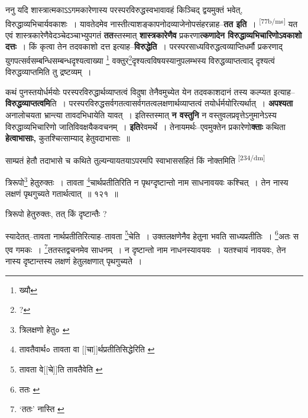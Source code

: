 \documentclass[article,12pt,a4paper]{memoir}
\begin{document}
	  \pstart ननु यदि शास्त्रात्मकाऽऽगमकारेणास्य परस्परविरुद्धस्वभावावहं किञ्चिद् द्वयमुक्तं भवेत्, विरुद्धाव्यभिचार्यवकाशः । यावतेदमेव नास्तीत्याशङ्कापनोदव्याजेनोपसंहरन्नाह--\textbf{तत इति} । \leavevmode\textsuperscript{\rmlatinfont\tiny [77b/ms]} यत एवं शास्त्रकारेणैवेदञ्चेदञ्चाभ्युपगतं \textbf{तत}स्तस्मात् \textbf{शास्त्रकारेणैव} प्रकरणा\textbf{त्कणादेन विरुद्धाव्यभिचारिणोऽवकाशो दत्तः} । किं कृत्वा तेन तदवकाशो दत्त इत्याह--\textbf{विरुद्धेति} । परस्परसाध्यविरुद्धत्वव्याप्तिधर्मौ प्रकरणाद् युगपत्सर्वसम्बन्धिसम्बन्धदृश्यत्वाख्या \footnote{ख्यौ} वक्तुर\footnote{?}दृश्यत्वविषयस्यानुपलम्भस्य विरुद्धव्याप्तत्वाद् दृश्यत्वं विरुद्धव्याप्तमिति तु द्रष्टव्यम् ।
	\pend
      

	  \pstart कथं पुनस्तयोर्धर्मयोः परस्परविरुद्धार्थव्याप्तत्वं विदुषा तेनैवमुच्येत येन तदवकाशदानं तस्य कल्प्यत इत्याह--\textbf{विरुद्धव्याप्तत्वमि}ति । परस्परविरुद्धसर्वगतत्वासर्वगतत्वलक्षणार्थव्याप्तत्वं तयोर्धर्मयोरित्यर्थात् । \textbf{अपश्यता} अनालोचयता भ्रान्त्या तावदभिधायेति यावत् । इतिस्तस्मात् \textbf{न वस्तुनि} न वस्तुवलप्रवृत्तेऽनुमानेऽस्य विरुद्धाव्यभिचारिणो जातिविवक्षयैकवचनम् । \textbf{इति}रेवमर्थे । तेनायमर्थः--एवमुक्तेन प्रकारेणो\textbf{क्ताः} कथिता \textbf{हेत्वाभासाः,} कुतश्चित्साम्याद् हेतुवदाभासाः ॥
	\pend
      

	  \pstart साम्प्रतं हेतौ तदाभासे च कथिते तुल्यन्यायतयाऽपरमपि स्वाभाससहितं किं नोक्तमिति  \leavevmode\textsuperscript{\rmlatinfont\tiny [234/dm]} 
	  
	त्रिरूपो\footnote{त्रिलक्षणो हेतु० \cite{dp-msC}} हेतुरुक्तः । तावता \footnote{तावतैवार्थ० \cite{dp-msB} \cite{dp-msD} \cite{dp-edP} \cite{dp-edH} \cite{dp-edE} \cite{dp-edN} तावता वा [[चा]]र्थप्रतीतिसिद्धेरिति \cite{dp-msC}}चार्थप्रतीतिरिति न पृथग्दृष्टान्तो नाम साधनावयवः कश्चित् । तेन नास्य लक्षणं पृथगुच्यते गतार्थत्वात् ॥ १२१ ॥ 
	  
	त्रिरूपो हेतुरुक्तः, तत् किं दृष्टान्तैः ? 
	  
	स्यादेतत्--तावता नार्थप्रतीतिरित्याह--तावता \footnote{तावता वे[[चे]]ति \cite{dp-msC} तावतैवेति \cite{dp-msB} \cite{dp-msD} \cite{dp-edP} \cite{dp-edH} \cite{dp-edE} \cite{dp-edN}}चेति । उक्तलक्षणेनैव हेतुना भवति साध्यप्रतीतिः । \footnote{ततः \cite{dp-msB}}अतः स एव गमकः । \footnote{‘ततः’ नास्ति \cite{dp-msA} \cite{dp-edP} \cite{dp-edH}}ततस्तद्वचनमेव साधनम् । न दृष्टान्तो नाम नाधनस्यावयवः । यतश्चायं नावयवः, तेन नास्य दृष्टान्तस्य लक्षणं हेतुलक्षणात् पृथगुच्यते । 
	  
\end{document}
